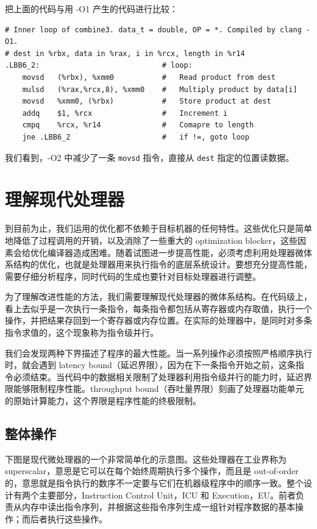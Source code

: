 把上面的代码与用 -O1 产生的代码进行比较：

\begin{verbatim}
# Inner loop of combine3. data_t = double, OP = *. Compiled by clang -O1.
# dest in %rbx, data in %rax, i in %rcx, length in %r14
.LBB6_2:                            # loop:
    movsd   (%rbx), %xmm0           #   Read product from dest
    mulsd   (%rax,%rcx,8), %xmm0    #   Multiply product by data[i]
    movsd   %xmm0, (%rbx)           #   Store product at dest
    addq    $1, %rcx                #   Increment i
    cmpq    %rcx, %r14              #   Comapre to length
    jne .LBB6_2                     #   if !=, goto loop
\end{verbatim}

我们看到，-O2 中减少了一条 \verb|movsd| 指令，直接从 \verb|dest| 指定的位置读数据。

\section{理解现代处理器}

到目前为止，我们运用的优化都不依赖于目标机器的任何特性。这些优化只是简单地降低了过程调用的开销，以及消除了一些重大的 optimization blocker，这些因素会给优化编译器造成困难。随着试图进一步提高性能，必须考虑利用处理器微体系结构的优化，也就是处理器用来执行指令的底层系统设计。要想充分提高性能，需要仔细分析程序，同时代码的生成也要针对目标处理器进行调整。

为了理解改进性能的方法，我们需要理解现代处理器的微体系结构。在代码级上，看上去似乎是一次执行一条指令，每条指令都包括从寄存器或内存取值，执行一个操作，并把结果存回到一个寄存器或内存位置。在实际的处理器中，是同时对多条指令求值的，这个现象称为指令级并行。

我们会发现两种下界描述了程序的最大性能。当一系列操作必须按照严格顺序执行时，就会遇到 latency bound（延迟界限），因为在下一条指令开始之前，这条指令必须结束。当代码中的数据相关限制了处理器利用指令级并行的能力时，延迟界限能够限制程序性能。throughput bound（吞吐量界限）刻画了处理器功能单元的原始计算能力，这个界限是程序性能的终极限制。

\subsection{整体操作}

下图是现代微处理器的一个非常简单化的示意图。这些处理器在工业界称为 superscalar，意思是它可以在每个始终周期执行多个操作，而且是 out-of-order 的，意思就是指令执行的数序不一定要与它们在机器级程序中的顺序一致。整个设计有两个主要部分，Instruction Control Unit，ICU 和 Execution，EU。前者负责从内存中读出指令序列，并根据这些指令序列生成一组针对程序数据的基本操作；而后者执行这些操作。

